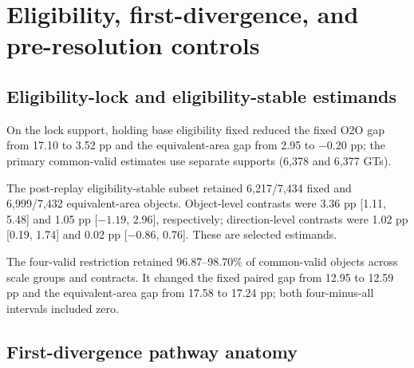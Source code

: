 \documentclass[preprint,10pt]{elsarticle}
\begin{document}
\section{Eligibility, first-divergence, and pre-resolution controls}

\subsection{Eligibility-lock and eligibility-stable estimands}

On the lock support, holding base eligibility fixed reduced the fixed O2O gap from 17.10 to 3.52 pp and the equivalent-area gap from 2.95 to $-0.20$ pp; the primary common-valid estimates use separate supports (6,378 and 6,377 GTs).

The post-replay eligibility-stable subset retained 6,217/7,434 fixed and 6,999/7,432 equivalent-area objects. Object-level contrasts were 3.36 pp [1.11, 5.48] and 1.05 pp [$-1.19$, 2.96], respectively; direction-level contrasts were 1.02 pp [0.19, 1.74] and 0.02 pp [$-0.86$, 0.76]. These are selected estimands.

\begin{table}[ht]
\centering
\caption{Sensitivity to requiring all four cardinal shifts to be legal among primary common-valid O2O/O2M objects. ``All legal'' is the original any-observed-legal-direction object estimand; ``four-valid'' excludes objects with fewer than four legal directions. Difference intervals use 5,000 paired stratified image-cluster bootstrap replicates.}
\resizebox{\textwidth}{!}{}
\end{table}

The four-valid restriction retained 96.87--98.70\% of common-valid objects across scale groups and contracts. It changed the fixed paired gap from 12.95 to 12.59 pp and the equivalent-area gap from 17.58 to 17.24 pp; both four-minus-all intervals included zero.

\subsection{First-divergence pathway anatomy}
\end{document}
